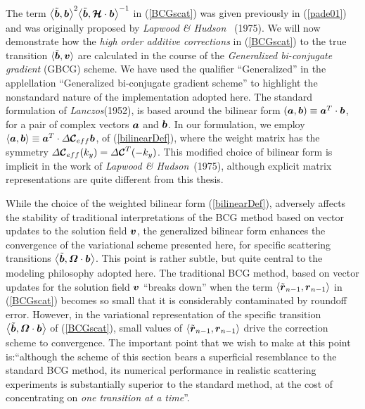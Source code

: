 The term 
$
{{\left\langle{\tilde{\mbox{\boldmath$\mit b$\unboldmath}},{\mbox{\boldmath$\mit b$\unboldmath}}}\right\rangle}^{2}}{\left\langle{\tilde{\mbox{\boldmath$\mit b$\unboldmath}},{\mbox{\boldmath$\cal H$\unboldmath}} \cdot 
{\mbox{\boldmath$\mit b$\unboldmath}}}\right\rangle}^{-1}
$
in (\ref{BCGscat}) was given previously in
(\ref{pade01}) and was originally proposed by {\em Lapwood \& Hudson\/} 
~(1975). We will now demonstrate how the {\em high order additive 
corrections\/} in (\ref{BCGscat}) to the true transition 
$\langle{\tilde{\mbox{\boldmath$\mit b$\unboldmath}}, {\mbox{\boldmath$\mit v$\unboldmath}}}\rangle$ are calculated in the course of the {\em Generalized 
bi-conjugate gradient \/}(GBCG) scheme. We have used the qualifier
``Generalized'' in the applellation ``Generalized bi-conjugate gradient 
scheme'' to highlight the nonstandard nature of the implementation adopted 
here. The standard formulation of {\em 
Lanczos\/}(1952), is based around the bilinear form 
$\left({\mbox{\boldmath$\mit a$\unboldmath}}, {\mbox{\boldmath$\mit b$\unboldmath}}\right)\equiv {\mbox{\boldmath$\mit a$\unboldmath}}^{T}\cdot {\mbox{\boldmath$\mit b$\unboldmath}}$, 
for a pair 
of complex vectors ${\mbox{\boldmath$\mit a$\unboldmath}}$ and  ${\mbox{\boldmath$\mit b$\unboldmath}}$. In our formulation, we 
employ
$\left\langle{\mbox{\boldmath$\mit a$\unboldmath}}, {\mbox{\boldmath$\mit b$\unboldmath}}\right\rangle\equiv 
{\mbox{\boldmath$\mit a$\unboldmath}}^{T}\cdot  {\mit \Delta}{\mbox{\boldmath$\cal C$\unboldmath}}_{eff} {\mbox{\boldmath$\mit b$\unboldmath}}$, of 
(\ref{bilinearDef}), where the weight matrix has the 
symmetry $ {\mit \Delta}{\mbox{\boldmath$\cal C$\unboldmath}}_{eff}(k_y) = {\mit \Delta}{\mbox{\boldmath$\cal C$\unboldmath}}^{T}(-k_y) $. This 
modified choice of bilinear form is implicit in the work of {\em Lapwood 
\& Hudson\/}~(1975), although  explicit matrix 
representations are quite different from this thesis. 

While the choice of the weighted bilinear form (\ref{bilinearDef}), 
adversely affects the stability
of traditional interpretations of the BCG method based on vector updates 
to the solution field $\mbox{\boldmath$\mit v$\unboldmath}$, the generalized bilinear form enhances 
the 
convergence of the variational scheme presented here, for specific 
scattering transitions  $\left\langle{\tilde{\mbox{\boldmath$\mit b$\unboldmath}}, {\mbox{\boldmath$\mit \Omega$\unboldmath}} 
\cdot 
{\mbox{\boldmath$\mit b$\unboldmath}}}\right\rangle$. This point is rather subtle, but quite central 
to the 
modeling philosophy adopted here. The traditional BCG method, based on 
vector 
updates for the solution field $\mbox{\boldmath$\mit v$\unboldmath}$ ``breaks down'' when the term
$\left\langle{{\tilde{ \mbox{\boldmath$\mit r$\unboldmath}}}_{  n-1}  
,{\mbox{\boldmath$\mit r$\unboldmath}}_{n-1}}\right\rangle$ in (\ref{BCGscat}) becomes so small that 
it is 
considerably contaminated by roundoff error. However, in the variational
representation of the specific transition $\left\langle{\tilde{\mbox{\boldmath$\mit b$\unboldmath}}, 
{\mbox{\boldmath$\mit \Omega$\unboldmath}} \cdot 
{\mbox{\boldmath$\mit b$\unboldmath}}}\right\rangle$ of (\ref{BCGscat}), small values of 
$\left\langle{{\tilde{ \mbox{\boldmath$\mit r$\unboldmath}}}_{  n-1}  
,{\mbox{\boldmath$\mit r$\unboldmath}}_{n-1}}\right\rangle$ drive the correction scheme to convergence.
The important point that we wish to make at this point is:``although the 
scheme of this section bears a superficial resemblance to the standard 
BCG method, its numerical performance in realistic scattering experiments 
is substantially superior to the standard method, at the cost of 
concentrating on {\em one transition at a time\/}''.


